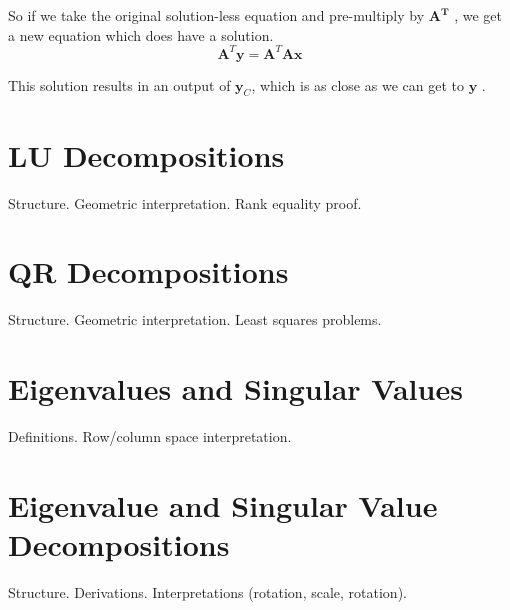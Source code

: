 \documentclass[a4paper,10pt]{article}
\newcommand{\mAT}{$\mathbf{A^T}$ }
\newcommand{\vy}{$\mathbf{y}$ }
\begin{document}
So if we take the original solution-less equation and pre-multiply by \mAT, we get a new equation which does have a solution.
%
\begin{equation}
 \mathbf{A}^T \mathbf{y} = \mathbf{A}^T \mathbf{A x}
\end{equation}

This solution results in an output of $\mathbf{y}_C$, which is as close as we can get to \vy.



\section{LU Decompositions}

Structure. Geometric interpretation. Rank equality proof.

\section{QR Decompositions}

Structure. Geometric interpretation. Least squares problems.

\section{Eigenvalues and Singular Values}

Definitions. Row/column space interpretation.

\section{Eigenvalue and Singular Value Decompositions}

Structure. Derivations. Interpretations (rotation, scale, rotation). 
\end{document}
